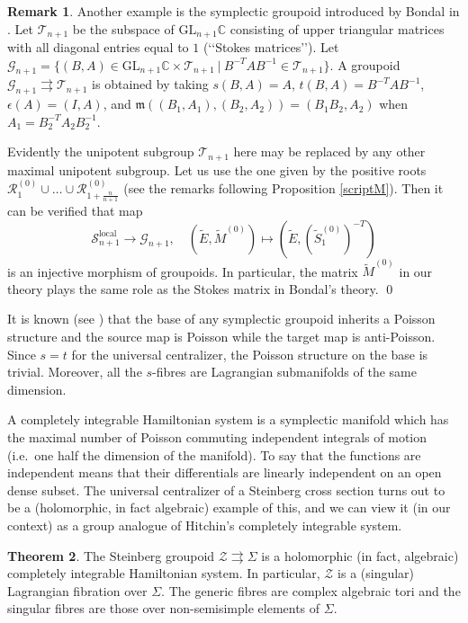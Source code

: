 \documentclass[a4paper,12pt,leqno]{amsart}
\numberwithin{equation}{section}
\theoremstyle{plain}
\theoremstyle{definition}
\newcommand{\GL}{\textrm{GL}}
\newcommand{\m}{\mathfrak{m}}
\newcommand{\cR}{\mathcal{R}}
\newcommand{\cS}{\mathcal{S}}
\newcommand{\cZ}{\mathcal{Z}}
\newcommand{\cT}{\mathcal{T}}
\newcommand{\cG}{\mathcal{G}}
\newcommand{\st}{\ \vert\ }
\renewcommand{\ll}{\lq\lq}
\newcommand{\rrr}{\rq\rq}
\newcommand{\tSz}{  \tilde S^{(0)}  }
\newcommand{\tE}{  \tilde E  }
\newcommand{\tMz}{  \tilde M^{(0)}  }
\newcommand{\cRz}{ \cR^{(0)}}
\newcommand{\rra}{\rightrightarrows}
\newcommand{\bC}{\mathbb{C}}
\newtheorem{thm}{Theorem}[section]
\newtheorem{rem}[thm]{Remark}
\begin{document}
\begin{rem}\label{remarkX.B}
Another example is the symplectic groupoid introduced by Bondal in \cite{Bo04}.
Let $\cT_{n+1}$ be the subspace of $\GL_{n+1}\bC$
consisting of upper triangular matrices with all diagonal entries equal to $1$ (\ll Stokes matrices\rrr).  Let
$\cG_{n+1}= \{ (B,A) \in \GL_{n+1}\bC \times \cT_{n+1} \st B^{-T} A B^{-1} \in \cT_{n+1} \}$.
A groupoid $\cG_{n+1}\rra\cT_{n+1}$ is obtained by taking $s(B,A)=A$,
$t(B,A)=B^{-T} A B^{-1}$, $\epsilon(A)=(I,A)$, and
$\m( (B_1,A_1),(B_2,A_2) )= (B_1B_2,A_2)$ when $A_1=B_2^{-T} A_2 B_2^{-1}$.

Evidently the unipotent subgroup $\cT_{n+1}$ here may be replaced by any other maximal unipotent subgroup.  Let us use the one
given by the positive roots
$\cRz_1\cup \dots\cup \cRz_{1+\scriptstyle\frac n{n+1}}$
(see the remarks following Proposition \ref{scriptM}).
Then it can be verified that map
\[
\cS_{n+1}^{\text{local}}\to \cG_{n+1},\quad
(\tE,\tMz)\mapsto (\tE, (\tSz_1)^{-T})
\]
is an injective morphism of groupoids. In particular, the matrix $\tMz$ in our theory
plays the same role as the Stokes matrix in Bondal's theory.
\qed
\end{rem}


It is known (see \cite{We87}) that the base of any symplectic groupoid
inherits a Poisson structure and the source map is Poisson while the target map is anti-Poisson.
Since $s=t$ for the universal centralizer, the Poisson structure on the base is trivial. 
Moreover, all the $s$-fibres are Lagrangian submanifolds of the same dimension.

A completely integrable Hamiltonian system is a symplectic manifold which has the maximal number of Poisson commuting independent integrals of motion (i.e.\ one half the dimension of the manifold). To say that the functions are independent  means that their differentials are linearly independent on an open dense subset. The universal centralizer of a Steinberg cross section turns out to be a (holomorphic, in fact algebraic) example of this, and we can view it (in our context) as a group analogue of Hitchin’s completely integrable system.


\begin{thm}
The Steinberg groupoid $\cZ\rightrightarrows \Sigma$ is a holomorphic (in fact, algebraic) completely integrable Hamiltonian system. 
In particular, $\cZ$ is a (singular) Lagrangian fibration over $\Sigma$. The generic fibres are complex algebraic tori and the singular fibres are those over non-semisimple elements of $\Sigma$.
\end{thm}
\end{document}
